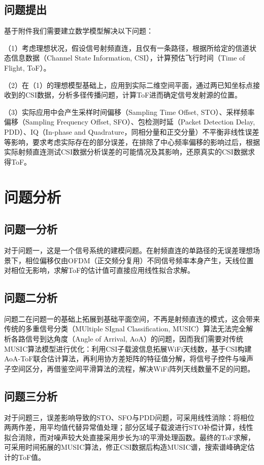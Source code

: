 \documentclass[withoutpreface,bwprint]{cumcmthesis}
\begin{document}
\subsection{问题提出}
基于附件我们需要建立数学模型解决以下问题：

（1）考虑理想状况，假设信号射频直连，且仅有一条路径，根据所给定的信道状态信息数据（Channel State Information, CSI），计算预估飞行时间（Time of Flight, ToF）。

（2）在（1）的理想模型基础上，应用到实际二维空间平面，通过两已知坐标点接收到的CSI数据，分析多径传播问题，计算ToF进而确定信号发射源的位置。

（3）实际应用中会产生采样时间偏移（Sampling Time Offset, STO）、采样频率偏移（Sampling Frequency Offset, SFO）、包检测时延（Packet Detection Delay, PDD）、IQ（In-phase and Quadrature，同相分量和正交分量）不平衡非线性误差等影响，要求考虑实际存在的部分误差，在排除了中心频率偏移的影响过后，根据实际射频直连测试CSI数据分析误差的可能情况及其影响，还原真实的CSI数据求得ToF。
\section{问题分析}
\subsection{问题一分析}
对于问题一，这是一个信号系统的建模问题。在射频直连的单路径的无误差理想场景下，相位偏移仅由OFDM（正交频分复用）不同信号频率本身产生，天线位置对相位无影响，求解ToF的估计值可直接应用线性拟合求解。

\subsection{问题二分析}	
问题二在问题一的基础上拓展到基础平面空间，不再是射频直连的模式，这会带来传统的多重信号分类（MUltiple SIgnal Classification, MUSIC）算法无法完全解析各路信号到达角度（Angle of Arrival, AoA）的问题，因而我们需要对传统MUSIC算法模型进行优化：利用CSI子载波信息拓展WiFi天线数，基于CSI构建AoA-ToF联合估计算法，再利用协方差矩阵的特征值分解，将信号子控件与噪声子空间区分，再借鉴空间平滑算法的流程，解决WiFi阵列天线数量不足的问题。

\subsection{问题三分析}
对于问题三，误差影响导致的STO、SFO与PDD问题，可采用线性消除：将相位两两作差，用平均值代替异常值处理；部分区域子载波进行STO补偿计算，线性拟合消除，而对噪声较大处直接采用步长为3的平滑处理函数。最终的ToF求解，可采用时间拓展的MUSIC算法，修正CSI数据后构造MUSIC谱，搜索谱峰确定估计的ToF值。
\end{document}
